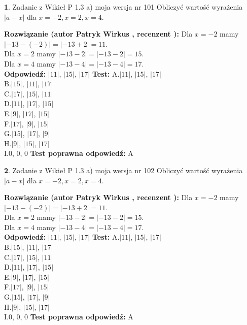 \documentclass[12pt, a4paper]{article}
\theoremstyle{definition} %
\newtheorem{zad}{}
\newcommand{\zadStart}[1]{\begin{zad}#1\newline}
\newcommand{\zadStop}{\end{zad}}
\newcommand{\rozwStart}[2]{\noindent \textbf{Rozwiązanie (autor #1 , recenzent #2): }\newline}
\newcommand{\rozwStop}{\newline}
\newcommand{\odpStart}{\noindent \textbf{Odpowiedź:}\newline}
\newcommand{\odpStop}{\newline}
\newcommand{\testStart}{\noindent \textbf{Test:}\newline}
\newcommand{\testStop}{\newline}
\newcommand{\kluczStart}{\noindent \textbf{Test poprawna odpowiedź:}\newline}
\newcommand{\kluczStop}{\newline}
\begin{document}
\zadStart{Zadanie z Wikieł P 1.3 a) moja wersja nr 101}
Obliczyć wartość wyrażenia $|a - x|$ dla $x=-2,x=2,x=4$.
\zadStop
\rozwStart{Patryk Wirkus}{}
Dla $x = -2$ mamy $|-13 - (-2)| = |-13 + 2| = 11$.\\
Dla $x = 2$ mamy $|-13 - 2| = |-13 - 2| = 15$.\\
Dla $x = 4$ mamy $|-13 - 4| = |-13 - 4| = 17$.\\
\rozwStop
\odpStart
$|11|$, $|15|$, $|17|$
\odpStop
\testStart
A.$|11|$, $|15|$, $|17|$\\
B.$|15|$, $|11|$, $|17|$\\
C.$|17|$, $|15|$, $|11|$\\
D.$|11|$, $|17|$, $|15|$\\
E.$|9|$, $|17|$, $|15|$\\
F.$|17|$, $|9|$, $|15|$\\
G.$|15|$, $|17|$, $|9|$\\
H.$|9|$, $|15|$, $|17|$\\
I.$0$, $0$, $0$
\testStop
\kluczStart
A
\kluczStop



\zadStart{Zadanie z Wikieł P 1.3 a) moja wersja nr 102}
Obliczyć wartość wyrażenia $|a - x|$ dla $x=-2,x=2,x=4$.
\zadStop
\rozwStart{Patryk Wirkus}{}
Dla $x = -2$ mamy $|-13 - (-2)| = |-13 + 2| = 11$.\\
Dla $x = 2$ mamy $|-13 - 2| = |-13 - 2| = 15$.\\
Dla $x = 4$ mamy $|-13 - 4| = |-13 - 4| = 17$.\\
\rozwStop
\odpStart
$|11|$, $|15|$, $|17|$
\odpStop
\testStart
A.$|11|$, $|15|$, $|17|$\\
B.$|15|$, $|11|$, $|17|$\\
C.$|17|$, $|15|$, $|11|$\\
D.$|11|$, $|17|$, $|15|$\\
E.$|9|$, $|17|$, $|15|$\\
F.$|17|$, $|9|$, $|15|$\\
G.$|15|$, $|17|$, $|9|$\\
H.$|9|$, $|15|$, $|17|$\\
I.$0$, $0$, $0$
\testStop
\kluczStart
A
\kluczStop
\end{document}

